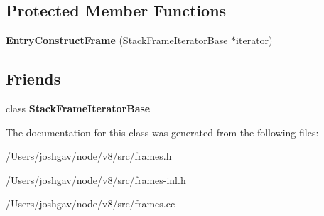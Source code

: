 \subsection*{Protected Member Functions}
\begin{DoxyCompactItemize}
\item 
{\bfseries Entry\+Construct\+Frame} (Stack\+Frame\+Iterator\+Base $\ast$iterator)\hypertarget{classv8_1_1internal_1_1_entry_construct_frame_a31ed14256685bf54ecc3285b5f537dc3}{}\label{classv8_1_1internal_1_1_entry_construct_frame_a31ed14256685bf54ecc3285b5f537dc3}

\end{DoxyCompactItemize}
\subsection*{Friends}
\begin{DoxyCompactItemize}
\item 
class {\bfseries Stack\+Frame\+Iterator\+Base}\hypertarget{classv8_1_1internal_1_1_entry_construct_frame_ac7310421866976ca454bbe11c5f926c3}{}\label{classv8_1_1internal_1_1_entry_construct_frame_ac7310421866976ca454bbe11c5f926c3}

\end{DoxyCompactItemize}


The documentation for this class was generated from the following files\+:\begin{DoxyCompactItemize}
\item 
/\+Users/joshgav/node/v8/src/frames.\+h\item 
/\+Users/joshgav/node/v8/src/frames-\/inl.\+h\item 
/\+Users/joshgav/node/v8/src/frames.\+cc\end{DoxyCompactItemize}
